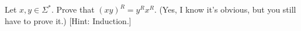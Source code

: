 Let $x,y \in \Sigma^*$. Prove that $(xy)^R = y^Rx^R$. (Yes, I know
it's obvious, but you still have to prove it.) [Hint: Induction.]
